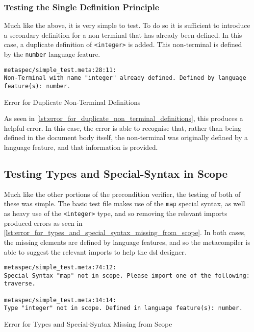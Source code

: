 \subsubsection{Testing the Single Definition Principle} %
\label{ssub:testing_the_single_definition_principle}
Much like the above, it is very simple to test.
To do so it is sufficient to introduce a secondary definition for a non-terminal that has already been defined. 
In this case, a duplicate definition of \texttt{<integer>} is added.
This non-terminal is defined by the \texttt{number} language feature.

\begin{listing}[!htb]
\begin{verbatim}
metaspec/simple_test.meta:28:11:
Non-Terminal with name "integer" already defined. Defined by language feature(s): number.
\end{verbatim}
\caption{Error for Duplicate Non-Terminal Definitions}
\label{lst:error_for_duplicate_non_terminal_definitions}
\end{listing}

As seen in \autoref{lst:error_for_duplicate_non_terminal_definitions}, this produces a helpful error. 
In this case, the error is able to recognise that, rather than being defined in the document body itself, the non-terminal was originally defined by a language feature, and that information is provided. 


\subsection{Testing Types and Special-Syntax in Scope} %
\label{sub:testing_types_and_special_syntax_in_scope}
Much like the other portions of the precondition verifier, the testing of both of these was simple. 
The basic test file makes use of the \texttt{map} special syntax, as well as heavy use of the \texttt{<integer>} type, and so removing the relevant imports produced errors as seen in \autoref{lst:error_for_types_and_special_syntax_missing_from_scope}.
In both cases, the missing elements are defined by language features, and so the metacompiler is able to suggest the relevant imports to help the \gls{dsl} designer. 

\begin{listing}[!htb]
\begin{verbatim}
metaspec/simple_test.meta:74:12:
Special Syntax "map" not in scope. Please import one of the following: traverse.

metaspec/simple_test.meta:14:14:
Type "integer" not in scope. Defined in language feature(s): number.
\end{verbatim}
\caption{Error for Types and Special-Syntax Missing from Scope}
\label{lst:error_for_types_and_special_syntax_missing_from_scope}
\end{listing}


